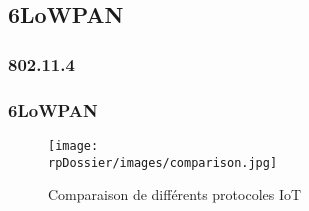 
\subsection{6LoWPAN}

\subsubsection{802.11.4}

\subsubsection{6LoWPAN}

\begin{figure}[h]
\begin{center}
\texttt{[image: \\rpDossier/images/comparison.jpg]}
\end{center}
\caption{Comparaison de différents protocoles IoT}
\label{comparison}
\end{figure}
